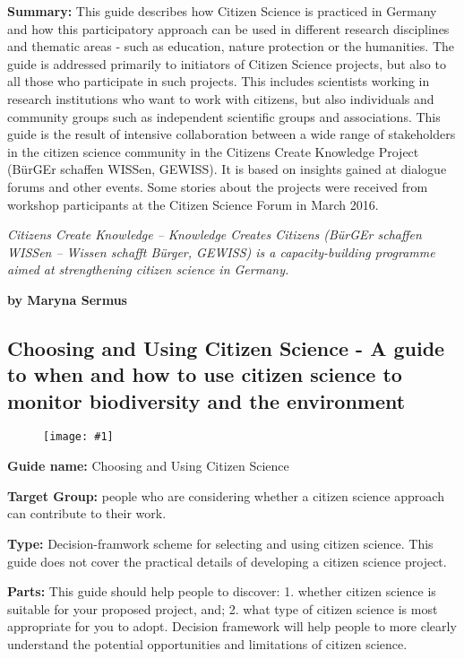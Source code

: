 \documentclass{article}
\newlength{\imgwidth}
\newcommand\scaledgraphics[2]{%
                
\settowidth{\imgwidth}{\texttt{[image: \#1]}}%
                
\setlength{\imgwidth}{\minof{\imgwidth}{#2\textwidth}}%
                
\texttt{[image: \#1]}%
                
}
\begin{document}
\textbf{Summary: }This guide describes how Citizen Science is practiced in Germany and how this participatory approach can be used in different research disciplines and thematic areas - such as education, nature protection or the humanities. The guide is addressed primarily to initiators of Citizen Science projects, but also to all those who participate in such projects. This includes scientists working in research institutions who want to work with citizens, but also individuals and community groups such as independent scientific groups and associations. This guide is the result of intensive collaboration between a wide range of stakeholders in the citizen science community in the Citizens Create Knowledge Project (BürGEr schaffen WISSen, GEWISS). It is based on insights gained at dialogue forums and other events. Some stories about the projects were received from workshop participants at the Citizen Science Forum in March 2016.


\emph{Citizens Create Knowledge – Knowledge Creates Citizens (BürGEr schaffen WISSen – Wissen schafft Bürger, GEWISS) is a capacity-building programme aimed at strengthening citizen science in Germany.}


\textbf{by Maryna Sermus}


\subsection{Choosing and Using Citizen Science - A guide to when and how to use citizen science to monitor biodiversity and the environment}\label{H1285339}


\begin{figure}
\scaledgraphics{dba5d5eb-235c-4694-a2d4-c26b6e16182b.png}{0.5}
\label{F60064251}
\end{figure}


\textbf{Guide name: }Choosing and Using Citizen Science \autocite{pocock_choosing_2014}


\textbf{Target Group: }people who are considering whether a citizen science approach can contribute to their work.


\textbf{Type: }Decision-framwork scheme for selecting and using citizen science. This guide does not cover the practical details of developing a citizen science project.


\textbf{Parts: }This guide should help people to discover:  1. whether citizen science is suitable for your proposed project, and;  2. what type of citizen science is most appropriate for you to adopt. Decision framework will help people to more clearly understand the potential opportunities and limitations of citizen science.
\end{document}
